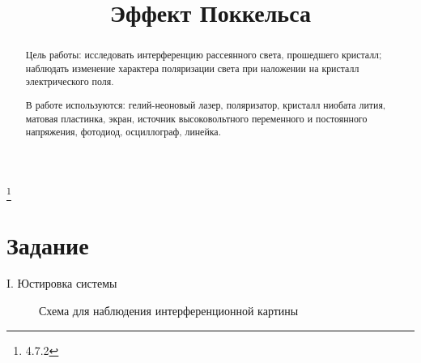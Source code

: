 


\title{Эффект Поккельса}
\thanks{4.7.2}



\begin{abstract}
Цель работы: исследовать интерференцию рассеянного света, прошедшего кристалл; наблюдать изменение характера поляризации света при наложении на кристалл электрического поля.

В работе используются: гелий-неоновый лазер, поляризатор, кристалл ниобата лития, матовая пластинка, экран, источник высоковольтного переменного и постоянного напряжения, фотодиод, осциллограф, линейка.\\

\end{abstract}

\maketitle


\section{\label{sec:level1}Задание}

\begin{center}
I. Юстировка системы
\end{center}

\begin{figure}[h]
    \caption{Схема для наблюдения интерференционной картины}
\end{figure}

